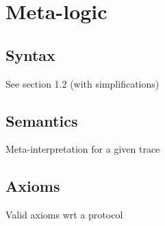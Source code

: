\section{Meta-logic}

\subsection{Syntax}

See section 1.2 (with simplifications)

\subsection{Semantics}

Meta-interpretation for a given trace

\subsection{Axioms}

Valid axioms wrt a protocol

